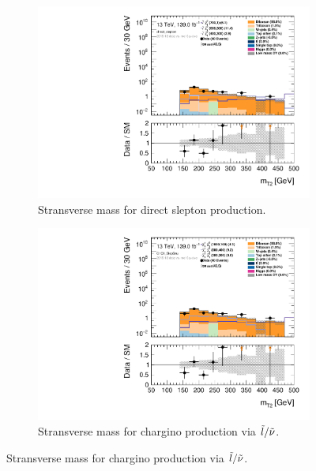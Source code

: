 \begin{figure}[H]
\centering
    \begin{subfigure}[t!]{0.49\textwidth}
        \includegraphics[width=\textwidth]{Figures/cutandcount/hist1d_mt2_direct_slepton.pdf}
    \caption{Stransverse mass for direct slepton production.}
    \label{fig:cutandcountslepslep}
    \end{subfigure}
    \begin{subfigure}[t!]{0.49\textwidth}
        \includegraphics[width=\textwidth]{Figures/cutandcount/hist1d_mt2_C1C1_SlepSnu.pdf}
    \caption{Stransverse mass for chargino production via $\Tilde{l}/\Tilde{\nu}$.}

\end{subfigure}
\end{figure}
